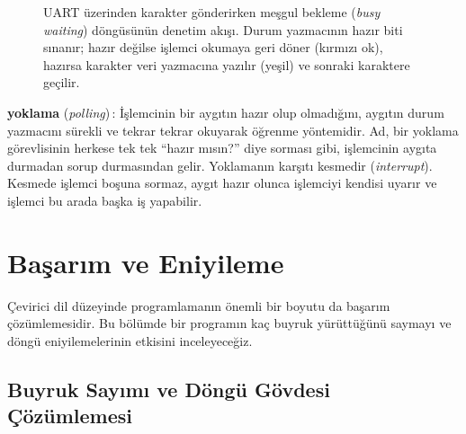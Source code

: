 \begin{figure}[htbp]
\centering
{}
\caption[UART yoklama döngüsünün denetim akışı]{UART üzerinden karakter gönderirken meşgul bekleme (\emph{busy waiting}) döngüsünün denetim akışı. Durum yazmacının hazır biti sınanır; hazır değilse işlemci okumaya geri döner (kırmızı ok), hazırsa karakter veri yazmacına yazılır (yeşil) ve sonraki karaktere geçilir.}
\label{fig:uart-yoklama}
\end{figure}

\begin{terimnotu}
\textbf{yoklama} (\emph{polling})\,: İşlemcinin bir aygıtın hazır olup olmadığını, aygıtın durum yazmacını sürekli ve tekrar tekrar okuyarak öğrenme yöntemidir. Ad, bir yoklama görevlisinin herkese tek tek ``hazır mısın?'' diye sorması gibi, işlemcinin aygıta durmadan sorup durmasından gelir. Yoklamanın karşıtı kesmedir (\emph{interrupt}). Kesmede işlemci boşuna sormaz, aygıt hazır olunca işlemciyi kendisi uyarır ve işlemci bu arada başka iş yapabilir.
\end{terimnotu}


\section{Başarım ve Eniyileme}
\label{sec:basarim-eniyileme}

Çevirici dil düzeyinde programlamanın önemli bir boyutu da başarım çözümlemesidir. Bu bölümde bir programın kaç buyruk yürüttüğünü saymayı ve döngü eniyilemelerinin etkisini inceleyeceğiz.

\subsection{Buyruk Sayımı ve Döngü Gövdesi Çözümlemesi}
\label{subsec:buyruk-sayimi}

